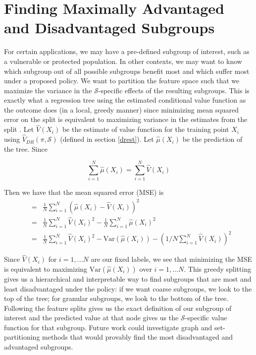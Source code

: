 \section{Finding Maximally Advantaged and Disadvantaged Subgroups} \label{finding}
For certain applications, we may have a pre-defined subgroup of interest, such as a vulnerable or protected population. In other contexts, we may want to know which subgroup out of all possible subgroups benefit most and which suffer most under a proposed policy. We want to partition the feature space such that we maximize the variance in the $\mathcal{S}$-specific effects of the resulting subgroups. This is exactly what a regression tree using the estimated conditional value function as the outcome  does (in a local, greedy manner) since minimizing mean squared error on the split is equivalent to maximizing variance in the estimates from the split \cite{wager2017estimation}. Let $\widehat{V}(X_i)$ be the estimate of value function for the training point $X_i$ using $\widehat{V}_{DR}(\pi, \mathcal{S})$ (defined in section \ref{drest}). Let $\hat{\mu}(X_i)$ be the prediction of the tree. Since 

\begin{equation*}
\sum_{i=1}^N \hat{\mu}(X_i) = \sum_{i=1}^N \widehat{V}(X_i)
\end{equation*}

Then we have that the mean squared error (MSE) is 
\begin{eqnarray*}
&=&\frac{1}{N} \sum_{i=1}^N (\hat{\mu}(X_i) - \widehat{V}(X_i))^2 
\\&=& \frac{1}{N}\sum_{i=1}^N \widehat{V}(X_i)^2 - \frac{1}{N} \sum_{i=1}^N \hat{\mu}(X_i)^2 
\\&=&\frac{1}{N}\sum_{i=1}^N \widehat{V}(X_i)^2 - \text{Var}(\hat{\mu}(X_i)) - (1/N \sum_{i=1}^N \widehat{V}(X_i))^2
\end{eqnarray*}

Since  $\widehat{V}(X_i)$ for $i=1,...N$ are our fixed labels, we see that minimizing the MSE is equivalent to maximizing $\text{Var}(\hat{\mu}(X_i))$ over $i=1,...N$. This greedy splitting gives us a hierarchical and interpretable way to find subgroups that are most and least disadvantaged under the policy: if we want coarse subgroups, we look to the top of the tree; for granular subgroups, we look to the bottom of the tree. Following the feature splits gives us the exact definition of our subgroup of interest and the predicted value at that node gives us the $\mathcal{S}$-specific value function for that subgroup. Future work could investigate graph and set-partitioning methods that would provably find the most disadvantaged and advantaged subgroups.